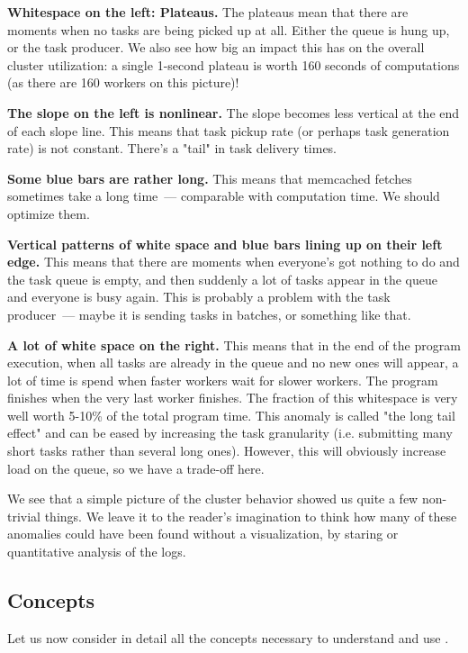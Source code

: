\documentclass{article}
\begin{document}
\textbf{Whitespace on the left: Plateaus.} The plateaus mean that there are moments when no tasks are being picked up at all. Either the queue is hung up, or the task producer. We also see how big an impact this has on the overall cluster utilization: a single 1-second plateau is worth 160 seconds of computations (as there are 160 workers on this picture)!

\textbf{The slope on the left is nonlinear.} The slope becomes less vertical at the end of each slope line. This means that task pickup rate (or perhaps task generation rate) is not constant. There's a "tail" in task delivery times. 

\textbf{Some blue bars are rather long.} This means that memcached fetches sometimes take a long time~--- comparable with computation time. We should optimize them.

\textbf{Vertical patterns of white space and blue bars lining up on their left edge.} This means that there are moments when everyone's got nothing to do and the task queue is empty, and then suddenly a lot of tasks appear in the queue and everyone is busy again. This is probably a problem with the task producer~--- maybe it is sending tasks in batches, or something like that.

\textbf{A lot of white space on the right.} This means that in the end of the program execution, when all tasks are already in the queue and no new ones will appear, a lot of time is spend when faster workers wait for slower workers. The program finishes when the very last worker finishes. The fraction of this whitespace is very well worth 5-10\% of the total program time. This anomaly is called "the long tail effect" and can be eased by increasing the task granularity (i.e. submitting many short tasks rather than several long ones). However, this will obviously increase load on the queue, so we have a trade-off here.

\vspace{3mm}

We see that a simple picture of the cluster behavior showed us quite a few non-trivial things. We leave it to the reader's imagination to think how many of these anomalies could have been found without a visualization, by staring or quantitative analysis of the logs.

\subsection{Concepts}

Let us now consider in detail all the concepts necessary to understand and use \splot{}.
\end{document}
